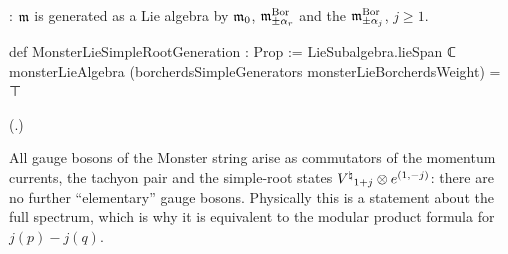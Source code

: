 \begin{definition}\label{ch18:def:hgen}
: $\mathfrak{m}$ is generated as a Lie algebra by $\mathfrak{m}_0$, $\mathfrak{m}^{\mathrm{Bor}}_{\pm\alpha_r}$ and the
$\mathfrak{m}^{\mathrm{Bor}}_{\pm\alpha_j}$, $j\ge1$.
\end{definition}
\begin{leancode}
def MonsterLieSimpleRootGeneration : Prop :=
  LieSubalgebra.lieSpan ℂ monsterLieAlgebra (borcherdsSimpleGenerators monsterLieBorcherdsWeight) =
    ⊤
\end{leancode}
(.)
\begin{physics}
All gauge bosons of the Monster string arise as commutators of the momentum currents, the tachyon pair and the simple-root
states ${V^{\natural}}_{1+j}\otimes e^{(1,-j)}$: there are no further ``elementary'' gauge bosons.  Physically this is a statement about
the full spectrum, which is why it is equivalent to the modular product formula for $j(p)-j(q)$.
\end{physics}

